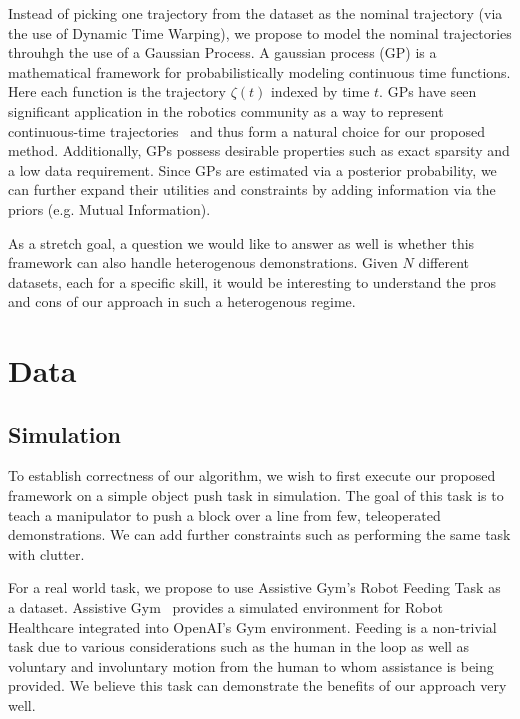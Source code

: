 Instead of picking one trajectory from the dataset as the nominal trajectory (via the use of Dynamic Time Warping), we propose to model the nominal trajectories throuhgh the use of a Gaussian Process. A gaussian process (GP) is a mathematical framework for probabilistically modeling continuous time functions. Here each function is the trajectory $\zeta(t)$ indexed by time $t$. GPs have seen significant application in the robotics community as a way to represent continuous-time trajectories~\cite{Barfoot14rss,Dong18icra} and thus form a natural choice for our proposed method. Additionally, GPs possess desirable properties such as exact sparsity and a low data requirement. Since GPs are estimated via a posterior probability, we can further expand their utilities and constraints by adding information via the priors (e.g. Mutual Information).

As a stretch goal, a question we would like to answer as well is whether this framework can also handle heterogenous demonstrations. Given $N$ different datasets, each for a specific skill, it would be interesting to understand the pros and cons of our approach in such a heterogenous regime.

\section{Data}

\subsection{Simulation}

To establish correctness of our algorithm, we wish to first execute our proposed framework on a simple object push task in simulation. The goal of this task is to teach a manipulator to push a block over a line from few, teleoperated demonstrations. We can add further constraints such as performing the same task with clutter.

For a real world task, we propose to use Assistive Gym's Robot Feeding Task as a dataset.
Assistive Gym~\cite{Erickson20icra} provides a simulated environment for Robot Healthcare integrated into OpenAI's Gym environment.
Feeding is a non-trivial task due to various considerations such as the human in the loop as well as voluntary and involuntary motion from the human to whom assistance is being provided. We believe this task can demonstrate the benefits of our approach very well.

